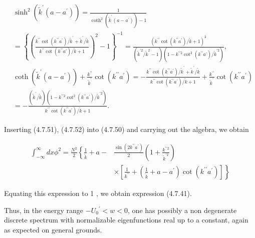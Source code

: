 \documentclass{article}
\begin{document}
\begin{align*}
& \sinh ^{2}\left(\tilde{k}^{\prime}\left(a-a^{\prime}\right)\right)=\frac{1}{\operatorname{coth}^{2}\left(\tilde{k}^{\prime}\left(a-a^{\prime}\right)\right)-1}  \tag{4.7.51}\\
& =\left\{\left(\frac{k^{\prime \prime} \cot \left(k^{\prime \prime} a^{\prime}\right) / \tilde{k}^{\prime}+\tilde{k}^{\prime} / \tilde{k}}{k^{\prime \prime} \cot \left(k^{\prime \prime} a^{\prime}\right) / \tilde{k}+1}\right)^{2}-1\right\}^{-1}=\frac{\left(k^{\prime \prime} \cot \left(k^{\prime \prime} a^{\prime}\right) / \tilde{k}+1\right)^{2}}{\left(\tilde{k}^{\prime 2} / \tilde{k}^{2}-1\right)\left(1-k^{\prime \prime 2} \cot ^{2}\left(k^{\prime \prime} a^{\prime}\right) / \tilde{k}^{\prime 2}\right)}, \\
& \operatorname{coth}\left(\tilde{k}^{\prime}\left(a-a^{\prime}\right)\right)+\frac{k^{\prime \prime}}{\tilde{k}^{\prime}} \cot \left(k^{\prime \prime} a^{\prime}\right)=-\frac{k^{\prime \prime} \cot \left(k^{\prime \prime} a^{\prime}\right) / \tilde{k}^{\prime}+\tilde{k}^{\prime} / \tilde{k}}{k^{\prime \prime} \cot \left(k^{\prime \prime} a^{\prime}\right) / \tilde{k}+1}+\frac{k^{\prime \prime}}{\tilde{k}^{\prime}} \cot \left(k^{\prime \prime} a^{\prime}\right)  \tag{4.7.52}\\
& =-\frac{\left(\tilde{k}^{\prime} / \tilde{k}\right)\left(1-k^{\prime \prime 2} \cot ^{2}\left(k^{\prime \prime} a^{\prime}\right) / \tilde{k}^{\prime 2}\right)}{k^{\prime \prime} \cot \left(k^{\prime \prime} a^{\prime}\right) / \tilde{k}+1} .
\end{align*}
 

Inserting (4.7.51), (4.7.52) into (4.7.50) and carrying out the algebra, we obtain
 
\begin{align*}
\int_{-\infty}^{\infty} d x \phi^{2}=\frac{N^{2}}{2}\left\{\frac{1}{\tilde{k}}+a-\right. & \frac{\sin \left(2 k^{\prime \prime} a^{\prime}\right)}{2}\left(1+\frac{k^{\prime \prime 2}}{\tilde{k}^{\prime 2}}\right)  \tag{4.7.53}\\
& \left.\times\left[\frac{1}{k^{\prime \prime}}+\left(\frac{1}{\tilde{k}}+a-a^{\prime}\right) \cot \left(k^{\prime \prime} a^{\prime}\right)\right]\right\}
\end{align*}
 

Equating this expression to 1 , we obtain expression (4.7.41).

Thus, in the energy range $-U_{0}{ }^{\prime}<w<0$, one has possibly a non degenerate discrete spectrum with normalizable eigenfunctions real up to a constant, again as expected on general grounds.
\end{document}

